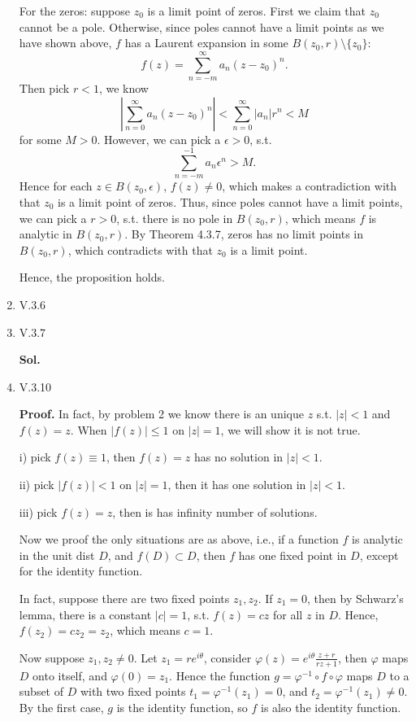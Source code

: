 \documentclass{article}%
\begin{document}
\begin{enumerate}
For the zeros: suppose $z_0 $ is a limit point of zeros. First we claim that $z_0 $ cannot be a pole. Otherwise, since poles cannot have a limit points as we have shown above, $f$ has a Laurent expansion in some $B(z_0, r)\setminus\{z_0\}$:
$$
f(z) = \sum_{n=-m}^{\infty}a_n(z-z_0)^n.
$$
Then pick $r < 1$, we know
$$
\left|\sum_{n=0}^{\infty}a_n (z-z_0)^n\right| < \sum_{n=0}^{\infty}|a_n|r^n < M
$$
for some $M > 0$. However, we can pick a $\epsilon > 0$, s.t. 
$$
\sum_{n=-m}^{-1}a_n\epsilon^n > M.
$$
Hence for each $z\in B(z_0, \epsilon)$, $f(z)\ne 0$, which makes a contradiction with that $z_0 $ is a limit point of zeros. Thus, since poles cannot have a limit points, we can pick a $r > 0$, s.t. there is no pole in $B(z_0, r)$, which means $f$ is analytic in $B(z_0, r)$. By Theorem 4.3.7, zeros has no limit points in $B(z_0, r)$, which contradicts with that $z_0 $ is a limit point.

Hence, the proposition holds.

\item V.3.6



\item V.3.7

\textbf{Sol.}



\item V.3.10

\textbf{Proof.} In fact, by problem 2 we know there is an unique $z$ s.t. $|z| < 1$ and $f(z) = z$. When $|f(z)| \le 1$ on $|z| = 1$, we will show it is not true.

i) pick $f(z) \equiv 1$, then $f(z) = z$ has no solution in $|z| < 1$.

ii) pick $|f(z)| < 1$ on $|z| = 1$, then it has one solution in $|z| < 1$.

iii) pick $f(z) = z$, then is has infinity number of solutions.

Now we proof the only situations are as above, i.e., if a function $f$ is analytic in the unit dist $D$, and $f(D)\subset D$, then $f$ has one fixed point in $D$, except for the identity function.

In fact, suppose there are two fixed points $z_1, z_2 $. If $z_1 = 0$, then by Schwarz's lemma, there is a constant $|c| = 1$, s.t. $f(z) = cz$ for all $z$ in $D$. Hence, $f(z_2) = cz_2 = z_2 $, which means $c = 1$.

Now suppose $z_1, z_2\ne 0 $. Let $z_1 = re^{i\theta} $, consider $\varphi(z) = e^{i\theta}\frac{z+r}{rz+1}$, then $\varphi$ maps $D$ onto itself, and $\varphi(0) = z_1 $. Hence the function $g = \varphi^{-1} \circ f\circ\varphi$ maps $D$ to a subset of $D$ with two fixed points $t_1 = \varphi^{-1}(z_1) = 0 $, and $t_2 = \varphi^{-1}(z_1) \ne 0 $. By the first case, $g$ is the identity function, so $f$ is also the identity function.

\end{enumerate}
\end{document}
